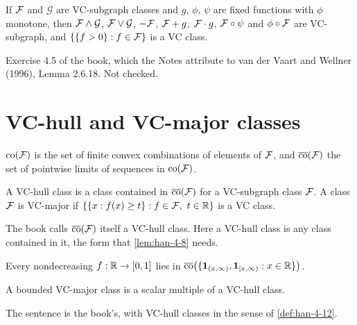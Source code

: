 \begin{lemma}
  \label{lem:han-4-7}
  If $\mathcal{F}$ and $\mathcal G$ are VC-subgraph classes and $g$, $\phi$, $\psi$ are fixed functions with $\phi$ monotone, then $\mathcal{F}\wedge\mathcal G$, $\mathcal{F}\vee\mathcal G$, $-\mathcal{F}$, $\mathcal{F}+g$, $\mathcal{F}\cdot g$, $\mathcal{F}\circ\psi$ and $\phi\circ\mathcal{F}$ are VC-subgraph, and $\{\{f>0\}:f\in\mathcal{F}\}$ is a VC class.
\end{lemma}
\begin{remark}
  Exercise 4.5 of the book, which the Notes attribute to van der Vaart and Wellner (1996), Lemma 2.6.18. Not checked.
\end{remark}

\section{VC-hull and VC-major classes}

\begin{definition}
  \label{def:han-4-11}
  $\mathrm{co}(\mathcal{F})$ is the set of finite convex combinations of elements of $\mathcal{F}$, and $\overline{\mathrm{co}}(\mathcal{F})$ the set of pointwise limits of sequences in $\mathrm{co}(\mathcal{F})$.
\end{definition}

\begin{definition}
  \label{def:han-4-12}
  A VC-hull class is a class contained in $\overline{\mathrm{co}}(\mathcal{F})$ for a VC-subgraph class $\mathcal{F}$. A class $\mathcal{F}$ is VC-major if $\{\{x:f(x)\ge t\}:f\in\mathcal{F},\ t\in\mathbb{R}\}$ is a VC class.
\end{definition}
\begin{remark}
  The book calls $\overline{\mathrm{co}}(\mathcal{F})$ itself a VC-hull class. Here a VC-hull class is any class contained in it, the form that \cref{lem:han-4-8} needs.
\end{remark}

\begin{lemma}
  \label{lem:han-ex-4-8}
  Every nondecreasing $f:\mathbb{R}\to[0,1]$ lies in $\overline{\mathrm{co}}\bigl(\{\mathbf{1}_{(x,\infty)},\mathbf{1}_{[x,\infty)}:x\in\mathbb{R}\}\bigr)$.
\end{lemma}

\begin{lemma}
  \label{lem:han-4-8}
  A bounded VC-major class is a scalar multiple of a VC-hull class.
\end{lemma}
\begin{remark}
  The sentence is the book's, with VC-hull classes in the sense of \cref{def:han-4-12}.
\end{remark}


